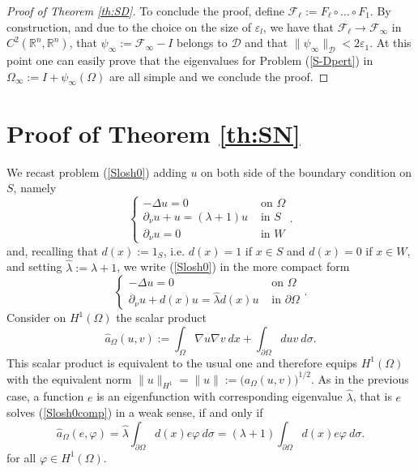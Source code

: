 \documentclass[a4paper,reqno,11pt,oneside]{amsart}
\theoremstyle{plain}
\theoremstyle{plain}
\theoremstyle{plain}
\theoremstyle{remark}
\begin{document}
\begin{proof}[Proof of Theorem  \ref{th:SD}]
To conclude the proof, define $\mathcal{F}_\ell:=F_\ell\circ\dots\circ F_1$. By construction, and due to the choice on the size of $\varepsilon_l$, we have that $\mathcal{F}_\ell\rightarrow \mathcal{F}_\infty$ in $C^2(\mathbb{R}^n,\mathbb{R}^n)$, that $\psi_\infty:=\mathcal{F}_\infty-I$ belongs to $\mathcal{D}$ and that $\|\psi_\infty\|_\mathcal{D}<2\varepsilon_1$. At this point one can easily prove that  the eigenvalues for Problem (\ref{S-Dpert}) in $\Omega_\infty:=I+\psi_\infty(\Omega)$ are all simple and we conclude the proof. \end{proof}

\section{Proof of Theorem \ref{th:SN}}\label{sec:sloshsimp}

We recast problem (\ref{Slosh0}) adding $u$ on both side of the boundary condition on $S$, namely 
\begin{equation*}
   \left\{
    \begin{array}{cc}
         -\Delta u=0& \text{ on } \Omega\\
        \partial_\nu u+u=(\lambda+1) u & \text{ in } S\\
        \partial_\nu u=0 & \text{ in }  W
    \end{array}.
    \right.
\end{equation*}
and, recalling that $d(x):=1_S$, i.e. $d(x)=1$ if $x\in S$ and $d(x)=0$ if $x\in W$, and setting $\hat \lambda:=\lambda+1$, we write  (\ref{Slosh0})  in the more compact form
\begin{equation}\label{Slosh0comp}
   \left\{
    \begin{array}{cc}
         -\Delta u=0& \text{ on } \Omega\\
        \partial_\nu u+d(x)u=\hat \lambda d(x) u & \text{ in } \partial \Omega
    \end{array}.
    \right.
\end{equation}
Consider on $H^1(\Omega)$ the scalar product
\[
\hat a_{\Omega}(u,v):=\int_\Omega \nabla u \nabla v \ dx +\int_{\partial \Omega} duv\ d\sigma .
\]
This scalar product is equivalent to the usual one and therefore equips $H^1(\Omega)$ with the equivalent norm $\| u\|_{H^1}=\|u\|:=\big(a_{\Omega}(u,v)\big)^{1/2}$. As in the previous case, a function $e$ is an eigenfunction with corresponding eigenvalue $\hat\lambda$, that is $e$ solves (\ref{Slosh0comp})  in a weak sense, if and only if 
$$
    \hat a_{\Omega}(e,\varphi)= \hat\lambda\int_{\partial \Omega} d(x)e\varphi\ d\sigma =(\lambda+1)\int_{\partial \Omega} d(x)e\varphi\ d\sigma .
$$
for all $\varphi\in H^1(\Omega)$. 
\end{document}
